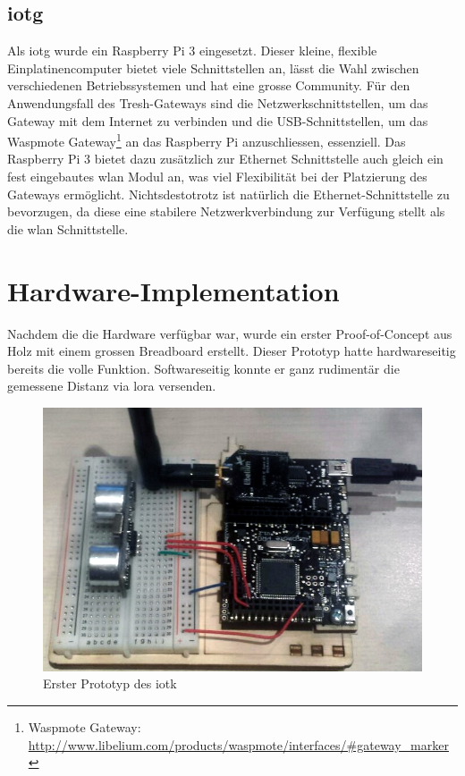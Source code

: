 \subsection{\gls{iotg}}
Als \gls{iotg} wurde ein Raspberry Pi 3 eingesetzt. Dieser kleine, flexible Einplatinencomputer bietet viele Schnittstellen an, lässt die Wahl zwischen verschiedenen Betriebssystemen und hat eine grosse Community. Für den Anwendungsfall des Tresh-Gateways sind die Netzwerkschnittstellen, um das Gateway mit dem Internet zu verbinden und die USB-Schnittstellen, um das Waspmote Gateway\footnote{Waspmote Gateway: \url{http://www.libelium.com/products/waspmote/interfaces/\#gateway_marker}} an das Raspberry Pi anzuschliessen, essenziell. Das Raspberry Pi 3 bietet dazu zusätzlich zur Ethernet Schnittstelle auch gleich ein fest eingebautes \gls{wlan} Modul an, was viel Flexibilität bei der Platzierung des Gateways ermöglicht. Nichtsdestotrotz ist natürlich die Ethernet-Schnittstelle zu bevorzugen, da diese eine stabilere Netzwerkverbindung zur Verfügung stellt als die \gls{wlan} Schnittstelle. 

\section{Hardware-Implementation}
Nachdem die die Hardware verfügbar war, wurde ein erster Proof-of-Concept aus Holz mit einem grossen Breadboard erstellt. Dieser Prototyp hatte hardwareseitig bereits die volle Funktion. Softwareseitig konnte er ganz rudimentär die gemessene Distanz via \gls{lora} versenden.

\begin{figure}[H]
     \centering
        \includegraphics[scale=0.6]{pictures/Prototype1.jpg}
    \caption{Erster Prototyp des \gls{iotk}}
    \label{fig:HCSR04}
\end{figure}

